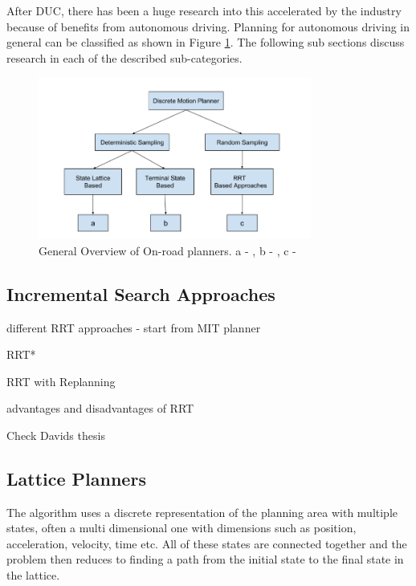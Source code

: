 After DUC, there has been a huge research into this accelerated by the industry because of benefits from autonomous driving. Planning for autonomous driving in general can be classified as shown in Figure \ref{related_work_classification}. The following sub sections discuss research in each of the described sub-categories. 

\begin{figure}[H]
	\centering
	\includegraphics[width=0.8\textwidth]{Images/related_work/planning_division.png}
	\caption{General Overview of On-road planners. a - \cite{cmu_parallel_thesis}  \cite{diss_shui_phd_thesis} \cite{traj_planner_optimization} \cite{lattice_Gu_Tiyanu} \cite{unit_A_star} , b - \cite{kolski_thesis} \cite{real_time_traj_plan_article} \cite{darpa_urban_challenge}, c -\cite{rrt_star} \cite{rrt_urban_driv} \cite{mit_rrt}
	}
	\label{related_work_classification}
\end{figure}

\subsection{Incremental Search Approaches}
\label{rw_incremental_search}

different RRT approaches - start from MIT planner

RRT*

RRT with Replanning

advantages and disadvantages of RRT

Check Davids thesis

\subsection{Lattice Planners}
\label{rw_lattice_planners}
The algorithm uses a discrete representation of the planning area with multiple states, often a multi dimensional one with dimensions such as position, acceleration, velocity, time etc. All of these states are connected together and the problem then reduces to finding a path from the initial state to the final state in the lattice. 

